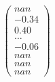 \documentclass[preview]{standalone}
\begin{document}
\begin{align*}
\begin{pmatrix} nan \\ -0.34 \\ 0.40 \\ \dots \\ -0.06 \\ nan \\ nan \\ nan \end{pmatrix}
\end{align*}
\end{document}
